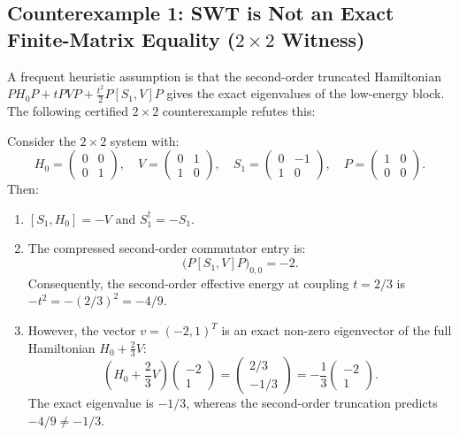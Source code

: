 \subsection[Counterexample 1: 2x2 Truncation Witness]{Counterexample 1: SWT is Not an Exact Finite-Matrix Equality ($2\times 2$ Witness)}

A frequent heuristic assumption is that the second-order truncated Hamiltonian $P H_0 P + t P V P + \frac{t^2}{2} P [S_1, V] P$ gives the exact eigenvalues of the low-energy block. The following certified $2\times 2$ counterexample refutes this:

\begin{proposition}
\label{prop:app_2x2_witness}
Consider the $2\times 2$ system with:
\begin{equation}
H_0 = \begin{pmatrix} 0 & 0 \\ 0 & 1 \end{pmatrix}, \quad V = \begin{pmatrix} 0 & 1 \\ 1 & 0 \end{pmatrix}, \quad S_1 = \begin{pmatrix} 0 & -1 \\ 1 & 0 \end{pmatrix}, \quad P = \begin{pmatrix} 1 & 0 \\ 0 & 0 \end{pmatrix}.
\end{equation}
Then:
\begin{enumerate}
    \item $[S_1, H_0] = -V$ and $S_1^\dagger = -S_1$.
    \item The compressed second-order commutator entry is:
    \begin{equation}
    \Big( P [S_1, V] P \Big)_{0, 0} = -2.
    \end{equation}
    Consequently, the second-order effective energy at coupling $t = 2/3$ is $-t^2 = -(2/3)^2 = -4/9$.
    \item However, the vector $v = (-2, 1)^T$ is an exact non-zero eigenvector of the full Hamiltonian $H_0 + \frac{2}{3} V$:
    \begin{equation}
    \left( H_0 + \frac{2}{3} V \right) \begin{pmatrix} -2 \\ 1 \end{pmatrix} = \begin{pmatrix} 2/3 \\ -1/3 \end{pmatrix} = -\frac{1}{3} \begin{pmatrix} -2 \\ 1 \end{pmatrix}.
    \end{equation}
    The exact eigenvalue is $-1/3$, whereas the second-order truncation predicts $-4/9 \neq -1/3$.
\end{enumerate}
\end{proposition}

